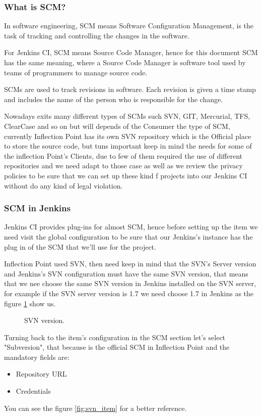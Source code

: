\documentclass[12pt]{article} %
\begin{document}
\subsubsection{What is SCM?} %

In software engineering, SCM means Software Configuration Management, is the task of tracking and controlling the changes in the software.

For Jenkins CI, SCM means Source Code Manager, hence for this document SCM has the same meaning, where a Source Code Manager is  software tool used by teams of programmers to manage source code.

SCMs are used to track revisions in software. Each revision is given a time stamp and includes the name of the person who is responsible for the change.

Nowadays exits many different types of SCMs such SVN, GIT, Mercurial, TFS, ClearCase and so on but will depends of the Consumer the type of SCM, currently Inflection Point has its own SVN repository which is the Official place to store the source code, but tuns important keep in mind the needs for some of the inflection Point's Clients, due to few of them required the use of different repositories and we need adapt to those case as well as we review the privacy policies to be sure that we can set up these kind f projects into our Jenkins CI without do any kind of legal violation.

\subsubsection{SCM in Jenkins} %
Jenkins CI provides plug-ins for almost SCM, hence before setting up the item we need visit the global configuration to be sure that our Jenkins's instance has the plug in of the SCM that we'll use for the project.

Inflection Point used SVN, then need keep in mind that the SVN's Server version and Jenkins's SVN configuration must have the same SVN version, that means that we nee choose the same SVN version in Jenkins installed on the SVN server, for example if the SVN server version is 1.7 we need choose 1.7 in Jenkins as the figure \ref{fig:svn_general} show us.

\begin{figure}[H] %
	\caption{SVN version.}
	\label{fig:svn_general}
\end{figure}

Turning back to the item's configuration in the SCM section let's select "Subversion", that because is the official SCM in Inflection Point and the mandatory fields are:
\begin{itemize}
	\item Repository URL
	\item Credentials
\end{itemize}
You can see the figure \ref{fig:svn_item} for a better reference.
\end{document}
